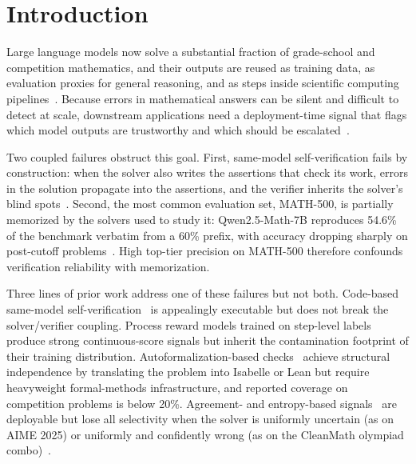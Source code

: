 \documentclass{article}
\begin{document}
\section{Introduction}

Large language models now solve a substantial fraction of grade-school and competition mathematics, and their outputs are reused as training data, as evaluation proxies for general reasoning, and as steps inside scientific computing pipelines~\citep{wei2022cot, hendrycks2021math, lightman2024prm, deepseek2025r1}. Because errors in mathematical answers can be silent and difficult to detect at scale, downstream applications need a deployment-time signal that flags which model outputs are trustworthy and which should be escalated~\citep{kuhn2023semantic, farquhar2024nature, ste2024}.

Two coupled failures obstruct this goal. First, same-model self-verification fails by construction: when the solver also writes the assertions that check its work, errors in the solution propagate into the assertions, and the verifier inherits the solver's blind spots~\citep{huang2024selfcorrect, tyen2024llm, stechly2024selfverify, kim2025correlated}. Second, the most common evaluation set, MATH-500, is partially memorized by the solvers used to study it: Qwen2.5-Math-7B reproduces 54.6\% of the benchmark verbatim from a 60\% prefix, with accuracy dropping sharply on post-cutoff problems~\citep{wu2025contam, matharena2025}. High top-tier precision on MATH-500 therefore confounds verification reliability with memorization.

Three lines of prior work address one of these failures but not both. Code-based same-model self-verification~\citep{mathcoder2024, mathshepherd2024} is appealingly executable but does not break the solver/verifier coupling. Process reward models trained on step-level labels~\citep{lightman2024prm, mathshepherd2024, qwenprm2025, skyworkprm2024, prime2025, rstarmath2025} produce strong continuous-score signals but inherit the contamination footprint of their training distribution. Autoformalization-based checks~\citep{dtv2024, openproof2025} achieve structural independence by translating the problem into Isabelle or Lean but require heavyweight formal-methods infrastructure, and reported coverage on competition problems is below 20\%. Agreement- and entropy-based signals~\citep{wang2023selfconsistency, kuhn2023semantic, farquhar2024nature, kadavath2022, xiong2024llmuncertainty} are deployable but lose all selectivity when the solver is uniformly uncertain (as on AIME 2025) or uniformly and confidently wrong (as on the CleanMath olympiad combo)~\citep{wu2025contam}.
\end{document}
